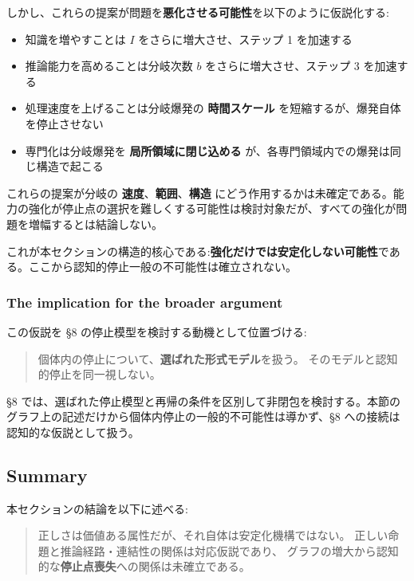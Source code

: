 しかし、これらの提案が問題を\textbf{悪化させる可能性}を以下のように仮説化する:

\begin{itemize}
\item 知識を増やすことは $I$ をさらに増大させ、ステップ 1 を加速する
\item 推論能力を高めることは分岐次数 $b$ をさらに増大させ、ステップ 3 を加速する
\item 処理速度を上げることは分岐爆発の \textbf{時間スケール} を短縮するが、爆発自体を停止させない
\item 専門化は分岐爆発を \textbf{局所領域に閉じ込める} が、各専門領域内での爆発は同じ構造で起こる
\end{itemize}

これらの提案が分岐の \textbf{速度}、\textbf{範囲}、\textbf{構造} にどう作用するかは未確定である。能力の強化が停止点の選択を難しくする可能性は検討対象だが、すべての強化が問題を増幅するとは結論しない。

これが本セクションの構造的核心である:\textbf{強化だけでは安定化しない可能性}である。ここから認知的停止一般の不可能性は確立されない。

\subsubsection{The implication for the broader argument}


この仮説を \S{}8 の停止模型を検討する動機として位置づける:

\begin{quote}
個体内の停止について、\textbf{選ばれた形式モデル}を扱う。
そのモデルと認知的停止を同一視しない。
\end{quote}

\S{}8 では、選ばれた停止模型と再帰の条件を区別して非閉包を検討する。本節のグラフ上の記述だけから個体内停止の一般的不可能性は導かず、\S{}8 への接続は認知的な仮説として扱う。

\subsection{Summary}


本セクションの結論を以下に述べる:

\begin{quote}
正しさは価値ある属性だが、それ自体は安定化機構ではない。
正しい命題と推論経路・連結性の関係は対応仮説であり、
グラフの増大から認知的な\textbf{停止点喪失}への関係は未確立である。
\end{quote}

